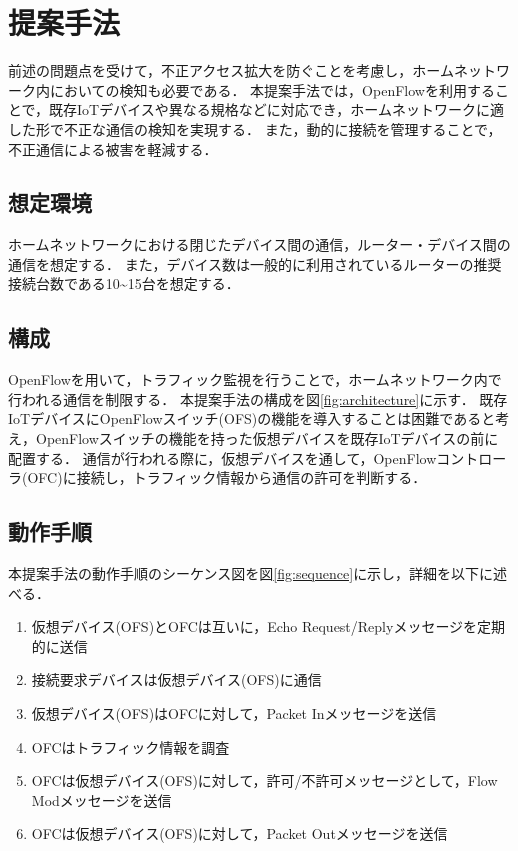 \documentclass[a4paper,10pt,twocolumn,uplatex]{jsarticle}
\begin{document}
\section{提案手法}
前述の問題点を受けて，不正アクセス拡大を防ぐことを考慮し，ホームネットワーク内においての検知も必要である．
本提案手法では，OpenFlowを利用することで，既存IoTデバイスや異なる規格などに対応でき，ホームネットワークに適した形で不正な通信の検知を実現する．
また，動的に接続を管理することで，不正通信による被害を軽減する．

\subsection{想定環境}
ホームネットワークにおける閉じたデバイス間の通信，ルーター・デバイス間の通信を想定する．
また，デバイス数は一般的に利用されているルーターの推奨接続台数である10\textasciitilde15台を想定する．

\subsection{構成}
OpenFlowを用いて，トラフィック監視を行うことで，ホームネットワーク内で行われる通信を制限する．
本提案手法の構成を図\ref{fig:architecture}に示す．
既存IoTデバイスにOpenFlowスイッチ(OFS)の機能を導入することは困難であると考え，OpenFlowスイッチの機能を持った仮想デバイスを既存IoTデバイスの前に配置する．
通信が行われる際に，仮想デバイスを通して，OpenFlowコントローラ(OFC)に接続し，トラフィック情報から通信の許可を判断する．

\subsection{動作手順}
本提案手法の動作手順のシーケンス図を図\ref{fig:sequence}に示し，詳細を以下に述べる．

\begin{enumerate}
  \item 仮想デバイス(OFS)とOFCは互いに，Echo Request/Replyメッセージを定期的に送信
  \item 接続要求デバイスは仮想デバイス(OFS)に通信
  \item 仮想デバイス(OFS)はOFCに対して，Packet Inメッセージを送信
  \item OFCはトラフィック情報を調査
  \item OFCは仮想デバイス(OFS)に対して，許可/不許可メッセージとして，Flow Modメッセージを送信
  \item OFCは仮想デバイス(OFS)に対して，Packet Outメッセージを送信
\end{enumerate}
\end{document}
